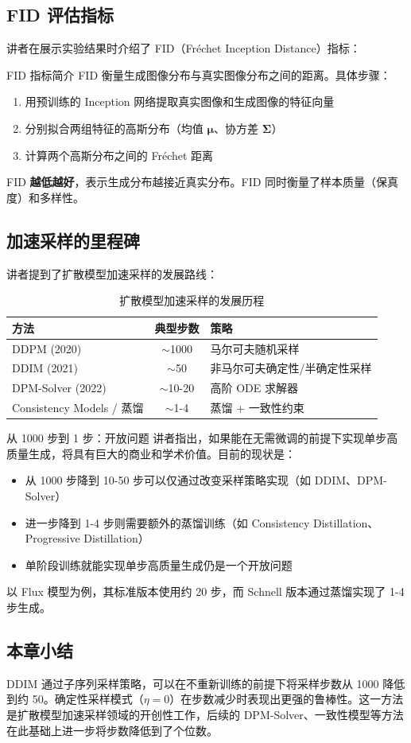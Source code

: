 \subsection{FID 评估指标}

讲者在展示实验结果时介绍了 FID（Fr\'{e}chet Inception Distance）指标：

\begin{knowledgebox}{FID 指标简介}
FID 衡量生成图像分布与真实图像分布之间的距离。具体步骤：
\begin{enumerate}
    \item 用预训练的 Inception 网络提取真实图像和生成图像的特征向量
    \item 分别拟合两组特征的高斯分布（均值 $\boldsymbol{\mu}$、协方差 $\boldsymbol{\Sigma}$）
    \item 计算两个高斯分布之间的 Fr\'{e}chet 距离
\end{enumerate}
FID \textbf{越低越好}，表示生成分布越接近真实分布。FID 同时衡量了样本质量（保真度）和多样性。
\end{knowledgebox}

\subsection{加速采样的里程碑}

讲者提到了扩散模型加速采样的发展路线：

\begin{table}[H]
\centering
\caption{扩散模型加速采样的发展历程}
\begin{tabular}{lcl}
\toprule
\textbf{方法} & \textbf{典型步数} & \textbf{策略} \\
\midrule
DDPM (2020) & $\sim$1000 & 马尔可夫随机采样 \\
DDIM (2021) & $\sim$50 & 非马尔可夫确定性/半确定性采样 \\
DPM-Solver (2022) & $\sim$10-20 & 高阶 ODE 求解器 \\
Consistency Models / 蒸馏 & $\sim$1-4 & 蒸馏 + 一致性约束 \\
\bottomrule
\end{tabular}
\end{table}

\begin{knowledgebox}{从 1000 步到 1 步：开放问题}
讲者指出，如果能在无需微调的前提下实现单步高质量生成，将具有巨大的商业和学术价值。目前的现状是：
\begin{itemize}
    \item 从 1000 步降到 10-50 步可以仅通过改变采样策略实现（如 DDIM、DPM-Solver）
    \item 进一步降到 1-4 步则需要额外的蒸馏训练（如 Consistency Distillation、Progressive Distillation）
    \item 单阶段训练就能实现单步高质量生成仍是一个开放问题
\end{itemize}
以 Flux 模型为例，其标准版本使用约 20 步，而 Schnell 版本通过蒸馏实现了 1-4 步生成。
\end{knowledgebox}

\subsection{本章小结}

DDIM 通过子序列采样策略，可以在不重新训练的前提下将采样步数从 1000 降低到约 50。确定性采样模式（$\eta=0$）在步数减少时表现出更强的鲁棒性。这一方法是扩散模型加速采样领域的开创性工作，后续的 DPM-Solver、一致性模型等方法在此基础上进一步将步数降低到了个位数。


